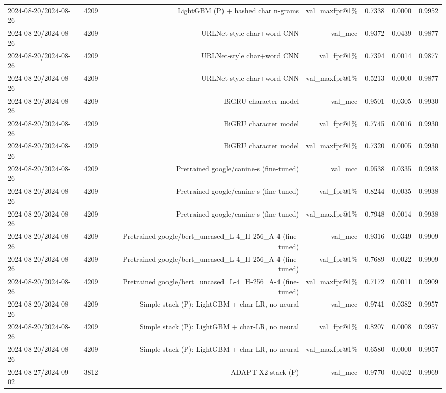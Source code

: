 \begin{table}[t]
\begin{tabular}{llrrrrr}
2024-08-20/2024-08-26 & 4209 & LightGBM (P) + hashed char n-grams & val\_maxfpr@1\% & 0.7338 & 0.0000 & 0.9952 \\
2024-08-20/2024-08-26 & 4209 & URLNet-style char+word CNN & val\_mcc & 0.9372 & 0.0439 & 0.9877 \\
2024-08-20/2024-08-26 & 4209 & URLNet-style char+word CNN & val\_fpr@1\% & 0.7394 & 0.0014 & 0.9877 \\
2024-08-20/2024-08-26 & 4209 & URLNet-style char+word CNN & val\_maxfpr@1\% & 0.5213 & 0.0000 & 0.9877 \\
2024-08-20/2024-08-26 & 4209 & BiGRU character model & val\_mcc & 0.9501 & 0.0305 & 0.9930 \\
2024-08-20/2024-08-26 & 4209 & BiGRU character model & val\_fpr@1\% & 0.7745 & 0.0016 & 0.9930 \\
2024-08-20/2024-08-26 & 4209 & BiGRU character model & val\_maxfpr@1\% & 0.7320 & 0.0005 & 0.9930 \\
2024-08-20/2024-08-26 & 4209 & Pretrained google/canine-s (fine-tuned) & val\_mcc & 0.9538 & 0.0335 & 0.9938 \\
2024-08-20/2024-08-26 & 4209 & Pretrained google/canine-s (fine-tuned) & val\_fpr@1\% & 0.8244 & 0.0035 & 0.9938 \\
2024-08-20/2024-08-26 & 4209 & Pretrained google/canine-s (fine-tuned) & val\_maxfpr@1\% & 0.7948 & 0.0014 & 0.9938 \\
2024-08-20/2024-08-26 & 4209 & Pretrained google/bert\_uncased\_L-4\_H-256\_A-4 (fine-tuned) & val\_mcc & 0.9316 & 0.0349 & 0.9909 \\
2024-08-20/2024-08-26 & 4209 & Pretrained google/bert\_uncased\_L-4\_H-256\_A-4 (fine-tuned) & val\_fpr@1\% & 0.7689 & 0.0022 & 0.9909 \\
2024-08-20/2024-08-26 & 4209 & Pretrained google/bert\_uncased\_L-4\_H-256\_A-4 (fine-tuned) & val\_maxfpr@1\% & 0.7172 & 0.0011 & 0.9909 \\
2024-08-20/2024-08-26 & 4209 & Simple stack (P): LightGBM + char-LR, no neural & val\_mcc & 0.9741 & 0.0382 & 0.9957 \\
2024-08-20/2024-08-26 & 4209 & Simple stack (P): LightGBM + char-LR, no neural & val\_fpr@1\% & 0.8207 & 0.0008 & 0.9957 \\
2024-08-20/2024-08-26 & 4209 & Simple stack (P): LightGBM + char-LR, no neural & val\_maxfpr@1\% & 0.6580 & 0.0000 & 0.9957 \\
2024-08-27/2024-09-02 & 3812 & ADAPT-X2 stack (P) & val\_mcc & 0.9770 & 0.0462 & 0.9969 \\

\end{tabular}
\end{table}
